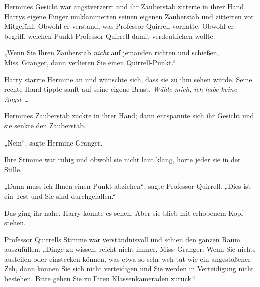 Hermines Gesicht war angstverzerrt und ihr Zauberstab zitterte in ihrer Hand. Harrys eigene Finger umklammerten seinen eigenen Zauberstab und zitterten vor Mitgefühl. Obwohl er verstand, was Professor Quirrell vorhatte. Obwohl er begriff, welchen Punkt Professor Quirrell damit verdeutlichen wollte.

„Wenn Sie Ihren Zauberstab \emph{nicht} auf jemanden richten und schießen, Miss~Granger, dann verlieren Sie einen Quirrell-Punkt.“

Harry starrte Hermine an und wünschte sich, dass sie zu ihm sehen würde. Seine rechte Hand tippte sanft auf seine eigene Brust. \emph{Wähle mich, ich habe keine Angst …}

Hermines Zauberstab zuckte in ihrer Hand; dann entspannte sich ihr Gesicht und sie senkte den Zauberstab.

„Nein“, sagte Hermine Granger.

Ihre Stimme war ruhig und obwohl sie nicht laut klang, hörte jeder sie in der Stille.

„Dann muss ich Ihnen einen Punkt abziehen“, sagte Professor Quirrell.
„Dies ist ein Test und Sie sind durchgefallen.“

Das ging ihr nahe. Harry konnte es sehen. Aber sie blieb mit erhobenem Kopf stehen.

Professor Quirrells Stimme war verständnisvoll und schien den ganzen Raum auszufüllen.
„Dinge zu wissen, reicht nicht immer, Miss~Granger. Wenn Sie nichts austeilen oder einstecken können, was etwa so sehr weh tut wie ein angestoßener Zeh, dann können Sie sich nicht verteidigen und Sie werden in Verteidigung nicht bestehen. Bitte gehen Sie zu Ihren Klassenkameraden zurück.“

